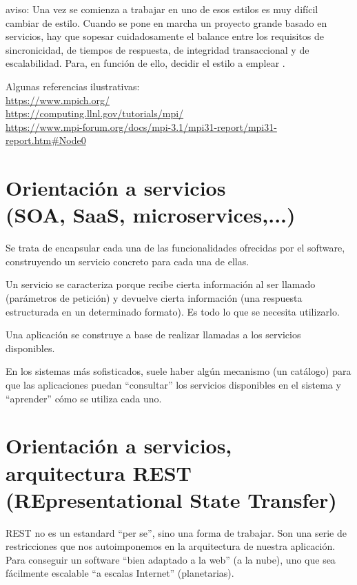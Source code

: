 \documentclass[spanish,12pt,a4paper,final,oneside]{book}
\begin{document}
aviso: Una vez se comienza a trabajar en uno de esos estilos es muy difícil cambiar de estilo. Cuando se pone en marcha un proyecto grande basado en servicios, hay que sopesar cuidadosamente el balance entre los requisitos de sincronicidad, de tiempos de respuesta, de integridad transaccional y de escalabilidad. Para, en función de ello, decidir el estilo a emplear .



\vspace{1cm}
Algunas referencias ilustrativas:
\\ \url{https://www.mpich.org/}
\\ \url{https://computing.llnl.gov/tutorials/mpi/}
\\ \url{https://www.mpi-forum.org/docs/mpi-3.1/mpi31-report/mpi31-report.htm#Node0}



\section{Orientación a servicios \\ (SOA, SaaS, microservices,...) }
Se trata de encapsular cada una de las funcionalidades ofrecidas por el software, construyendo un servicio concreto para cada una de ellas. 

Un servicio se caracteriza porque recibe cierta información al ser llamado (parámetros de petición) y devuelve cierta información (una respuesta estructurada en un determinado formato). Es todo lo que se necesita utilizarlo.

Una aplicación se construye a base de realizar llamadas a los servicios disponibles.

En los sistemas más sofisticados, suele haber algún mecanismo (un catálogo) para que las aplicaciones puedan “consultar” los servicios disponibles en el sistema y “aprender” cómo se utiliza cada uno.



\section{Orientación a servicios, arquitectura REST \\(REpresentational State Transfer)}

REST no es un estandard ``per se'', sino una forma de trabajar. Son una serie de restricciones que nos autoimponemos en la arquitectura de nuestra aplicación. Para conseguir un software ``bien adaptado a la web'' (a la nube), uno que sea fácilmente escalable ``a escalas Internet'' (planetarias).
\end{document}
